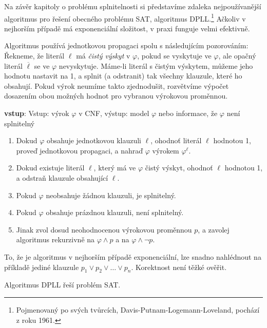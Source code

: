 Na závěr kapitoly o problému splnitelnosti si představíme zdaleka nejpoužívanější algoritmus pro řešení obecného problému SAT, algoritmus DPLL.\footnote{Pojmenovaný po svých tvůrcích, Davis-Putnam-Logemann-Loveland, pochází z roku 1961.} Ačkoliv v nejhorším případě má exponenciální složitost, v praxi funguje velmi efektivně.

Algoritmus používá jednotkovou propagaci spolu s následujícím pozorováním: Řekneme, že literál $\ell$ má \emph{čistý výskyt} v $\varphi$, pokud se vyskytuje ve $\varphi$, ale opačný literál $\overline{\ell}$ se ve $\varphi$ nevyskytuje. Máme-li literál s čistým výskytem, můžeme jeho hodnotu nastavit na 1, a splnit (a odstranit) tak všechny klauzule, které ho obsahují. Pokud výrok neumíme takto zjednodušit, rozvětvíme výpočet dosazením obou možných hodnot pro vybranou výrokovou proměnnou.

\begin{algorithm}[DPLL]
    \textbf{vstup}: Vstup: výrok $\varphi$ v CNF, výstup: model $\varphi$ nebo informace, že  $\varphi$ není splnitelný
    \begin{enumerate}                
        \item Dokud $\varphi$ obsahuje jednotkovou klauzuli $\ell$, ohodnoť literál $\ell$ hodnotou 1, proveď jednotkovou propagaci, a nahraď $\varphi$ výrokem $\varphi^\ell$.
         \item Dokud existuje literál $\ell$, který má ve $\varphi$ čistý výskyt, ohodnoť $\ell$ hodnotou 1, a odstraň klauzule obsahující $\ell$.
        \item Pokud $\varphi$ neobsahuje žádnou klauzuli, je splnitelný.
        \item Pokud $\varphi$ obsahuje prázdnou klauzuli, není splnitelný.
        \item Jinak zvol dosud neohodnocenou výrokovou proměnnou $p$, a zavolej algoritmus rekurzivně na $\varphi\land p$ a na $\varphi\land \neg p$.
    \end{enumerate}
\end{algorithm}

To, že je algoritmus v nejhorším případě exponenciální, lze snadno nahlédnout na příkladě jediné klauzule $p_1\lor p_2\lor\dots\lor p_n$. Korektnost není těžké ověřit.

\begin{proposition}
    Algoritmus DPLL řeší problém SAT.
\end{proposition}
    
